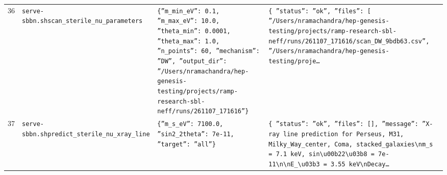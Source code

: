 \documentclass[11pt,a4paper]{article}
\begin{document}
\begin{longtable}{@{}p{}p{}p{}p{}@{}}
36 & \texttt{serve-sbbn.sh}\newline\texttt{scan\_\allowbreak{}sterile\_\allowbreak{}nu\_\allowbreak{}parameters} & \texttt{\{''m\_\allowbreak{}min\_\allowbreak{}eV'':\allowbreak{} 0.1,\allowbreak{} ''m\_\allowbreak{}max\_\allowbreak{}eV'':\allowbreak{} 10.0,\allowbreak{} ''theta\_\allowbreak{}min'':\allowbreak{} 0.0001,\allowbreak{} ''theta\_\allowbreak{}max'':\allowbreak{} 1.0,\allowbreak{} ''n\_\allowbreak{}points'':\allowbreak{} 60,\allowbreak{} ''mechanism'':\allowbreak{} ''DW'',\allowbreak{} ''output\_\allowbreak{}dir'':\allowbreak{} ''/\allowbreak{}Users/\allowbreak{}nramachandra/\allowbreak{}hep-genesis-testing/\allowbreak{}projects/\allowbreak{}ramp-research-sbl-neff/\allowbreak{}runs/\allowbreak{}261107\_\allowbreak{}171616''\}\allowbreak{}} & \texttt{\{   ''status'':\allowbreak{} ''ok'',\allowbreak{}   ''files'':\allowbreak{} [     ''/\allowbreak{}Users/\allowbreak{}nramachandra/\allowbreak{}hep-genesis-testing/\allowbreak{}projects/\allowbreak{}ramp-research-sbl-neff/\allowbreak{}runs/\allowbreak{}261107\_\allowbreak{}171616/\allowbreak{}scan\_\allowbreak{}DW\_\allowbreak{}9bdb63.csv'',\allowbreak{}     ''/\allowbreak{}Users/\allowbreak{}nramachandra/\allowbreak{}hep-genesis-testing/\allowbreak{}proje\ldots{}\allowbreak{}} \\
37 & \texttt{serve-sbbn.sh}\newline\texttt{predict\_\allowbreak{}sterile\_\allowbreak{}nu\_\allowbreak{}xray\_\allowbreak{}line} & \texttt{\{''m\_\allowbreak{}s\_\allowbreak{}eV'':\allowbreak{} 7100.0,\allowbreak{} ''sin2\_\allowbreak{}2theta'':\allowbreak{} 7e-11,\allowbreak{} ''target'':\allowbreak{} ''all''\}\allowbreak{}} & \texttt{\{   ''status'':\allowbreak{} ''ok'',\allowbreak{}   ''files'':\allowbreak{} []\allowbreak{},\allowbreak{}   ''message'':\allowbreak{} ''X-ray line prediction for Perseus,\allowbreak{} M31,\allowbreak{} Milky\_\allowbreak{}Way\_\allowbreak{}center,\allowbreak{} Coma,\allowbreak{} stacked\_\allowbreak{}galaxies\textbackslash{}\allowbreak{}nm\_\allowbreak{}s =\allowbreak{} 7.1 keV,\allowbreak{} sin\textbackslash{}\allowbreak{}u00b22\textbackslash{}\allowbreak{}u03b8 =\allowbreak{} 7e-11\textbackslash{}\allowbreak{}n\textbackslash{}\allowbreak{}nE\_\allowbreak{}\textbackslash{}\allowbreak{}u03b3 =\allowbreak{} 3.55 keV\textbackslash{}\allowbreak{}nDecay\ldots{}\allowbreak{}} \\

\end{longtable}
\end{document}
